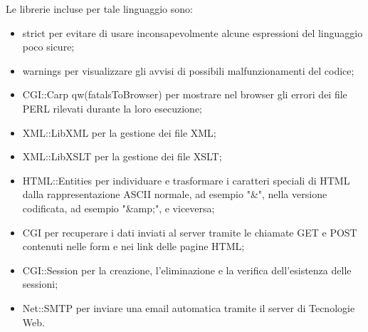 {	Le librerie incluse per tale linguaggio sono:
	\begin{itemize}\itemsep1pt
		\item strict per evitare di usare inconsapevolmente alcune espressioni del linguaggio poco sicure;
		\item warnings per visualizzare gli avvisi di possibili malfunzionamenti del codice;
		\item CGI::Carp qw(fatalsToBrowser) per mostrare nel browser gli errori dei file PERL rilevati durante la loro esecuzione;
		\item XML::LibXML per la gestione dei file XML;
		\item XML::LibXSLT per la gestione dei file XSLT;
		\item HTML::Entities per individuare e trasformare i caratteri speciali di HTML dalla rappresentazione ASCII normale, ad esempio "\&", nella versione codificata, ad esempio "\&amp;", e viceversa;
		\item CGI per recuperare i dati inviati al server tramite le chiamate GET e POST contenuti nelle form e nei link delle pagine HTML;
		\item CGI::Session per la creazione, l'eliminazione e la verifica dell'esistenza delle sessioni;
		\item Net::SMTP per inviare una email automatica tramite il server di Tecnologie Web.
	 \end{itemize}
}
